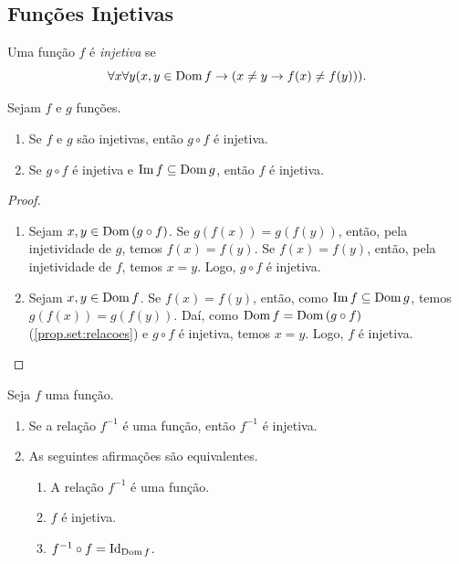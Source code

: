 \subsection{Funções Injetivas}

\begin{definition}
    Uma função $f$ é \emph{injetiva} se
        \[
            \forall x \forall y (x,y \in \operatorname{Dom} f \rightarrow (x \neq y \rightarrow f(x) \neq f(y))).
        \]
\end{definition}

\begin{proposition} \label{prop.set:feginj}
    Sejam $f$ e $g$ funções.
        \begin{enumerate}[leftmargin=*, align=left, label=\textbf{(\alph*)}]
            \item Se $f$ e $g$ são injetivas, então $g \circ f$ é injetiva.
            \item Se $g \circ f$ é injetiva e $\operatorname{Im} f \subseteq \operatorname{Dom} g$, então $f$ é injetiva.
        \end{enumerate}
\end{proposition}

\begin{proof}
    \leavevmode
        \begin{enumerate}[leftmargin=*, align=left, label=\textbf{(\alph*)}]
            \item Sejam $x,y \in \operatorname{Dom} \, (g \circ f)$. Se $g(f(x)) = g(f(y))$, então, pela injetividade de $g$, temos $f(x) = f(y)$. Se $f(x) = f(y)$, então, pela injetividade de $f$, temos $x = y$. Logo, $g \circ f$ é injetiva. \blackproof
            \item Sejam $x,y \in \operatorname{Dom} f$. Se $f(x) = f(y)$, então, como $\operatorname{Im} f \subseteq \operatorname{Dom} g$, temos $g (f(x)) = g(f(y))$. Daí, como $\operatorname{Dom} f = \operatorname{Dom} \, (g \circ f)$ (\cref{prop.set:relacoes}) e $g \circ f$ é injetiva, temos $x=y$. Logo, $f$ é injetiva. \blackproof
        \end{enumerate}
\end{proof}

\begin{theorem} \label{teo.set:inj}
    Seja $f$ uma função.
        \begin{enumerate}[leftmargin=*, align=left, label=\textbf{(\alph*)}]
            \item Se a relação $f^{-1}$ é uma função, então $f^{-1}$ é injetiva.
            \item As seguintes afirmações são equivalentes.
                \begin{enumerate}[label=\roman*.]
                    \item A relação $f^{-1}$ é uma função.
                    \item $f$ é injetiva.
                    \item $f^{-1} \circ f = \operatorname{Id}_{\operatorname{Dom} f}$.
                \end{enumerate}
        \end{enumerate}
\end{theorem}

